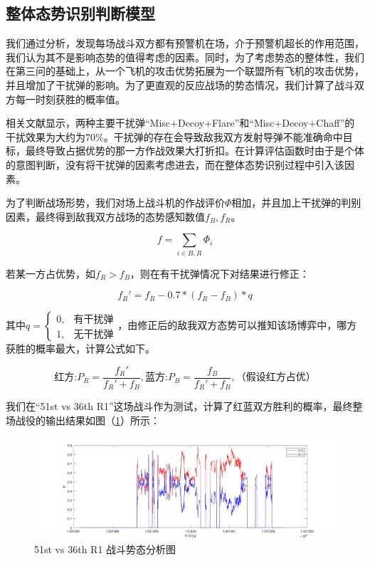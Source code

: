 \documentclass{my_paper}
\begin{document}
\subsection{整体态势识别判断模型}
我们通过分析，发现每场战斗双方都有预警机在场，介于预警机超长的作用范围，我们认为其不是影响态势的值得考虑的因素。同时，为了考虑势态的整体性，我们在第三问的基础上，从一个飞机的攻击优势拓展为一个联盟所有飞机的攻击优势，并且增加了干扰弹的影响。为了更直观的反应战场的势态情况，我们计算了战斗双方每一时刻获胜的概率值。

相关文献显示\cite{12}，两种主要干扰弹“Misc+Decoy+Flare”和“Misc+Decoy+Chaff”的干扰效果为大约为70\%。干扰弹的存在会导致敌我双方发射导弹不能准确命中目标，最终导致占据优势的那一方作战效果大打折扣。在计算评估函数时由于是个体的意图判断，没有将干扰弹的因素考虑进去，而在整体态势识别过程中引入该因素。

为了判断战场形势，我们对场上战斗机的作战评价$\Phi$相加，并且加上干扰弹的判别因素，最终得到敌我双方战场的态势感知数值$f_B,f_R$。

\begin{equation}
f = \sum_{i \in B,R} \Phi_i
\end{equation}

若某一方占优势，如$f_R>f_B$，则在有干扰弹情况下对结果进行修正：

\begin{equation}
    f_R' = f_R - 0.7*(f_R-f_B)*q
\end{equation}

其中$q=\begin{cases}0,&\text{有干扰弹}\\1,&\text{无干扰弹}\end{cases}$，由修正后的敌我双方态势可以推知该场博弈中，哪方获胜的概率最大，计算公式如下。

\begin{equation}
    \text{红方:}P_R = \frac{f_R'}{f_R'+f_B} ,\text{蓝方:} P_B = \frac{f_B}{f_R'+f_B},\text{（假设红方占优）}
\end{equation}

我们在“51st vs 36th R1”这场战斗作为测试，计算了红蓝双方胜利的概率，最终整场战役的输出结果如图（\ref{p}）所示：

\begin {figure}[h]
\centering %
\includegraphics[width=\textwidth]{p.jpg}
\caption{51st vs 36th R1 战斗势态分析图} %
\label{p}
\end {figure}
\end{document}
